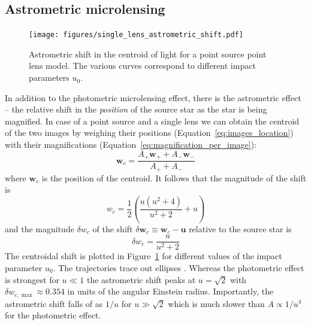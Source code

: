 \documentclass[12pt,dvipsnames]{report}
\renewcommand{\vec}[1]{\boldsymbol{\mathbf{#1}}}
\begin{document}
\subsection{Astrometric microlensing}
\label{ssec:astrometric_microlensing}
\begin{figure}[t]
    \begin{centering}
        \texttt{[image: figures/single\_lens\_astrometric\_shift.pdf]}
        \caption{
            Astrometric shift in the centroid of light for a point source point lens
            model.
            The various curves correspond to different impact parameters $u_0$.}
        \label{fig:single_lens_astrometric_shift}
    \end{centering}
\end{figure}

In addition to the photometric microlensing effect, there is the astrometric
effect -- the relative shift in the \emph{position} of the source star as the
star is being magnified. In case of a point source and a single lens we can
obtain the centroid of the two images by weighing their positions
(Equation~\ref{eq:images_location}) with their magnifications
(Equation~\ref{eq:magnification_per_image}):
\begin{equation}
    \vec w_c=\frac{A_+\vec w_+ + A_-\vec w_-}{A_+ + A_-}
\end{equation}
where $\vec w_c$ is the position of the centroid. It follows that the magnitude of the
shift is
\begin{equation}
    w_c=\frac{1}{2}\left(\frac{u(u^2 + 4)}{u^2+2}+u\right)
\end{equation}
and the magnitude $\delta w_c$ of the shift
$\delta \vec w_c\equiv\vec w_c - \vec u$ relative to the source star is
\begin{equation}
    \delta w_c = \frac{u}{u^2 + 2}
\end{equation}
The centroidal shift is plotted in Figure~\ref{fig:single_lens_astrometric_shift} for
different values of the impact parameter $u_0$. The trajectories trace out ellipses
\citep{1995ApJ...453...37W}.
Whereas the photometric effect is
strongest for
$u\ll 1$  the astrometric shift peaks at $u=\sqrt{2}$ with
$\delta w_{c,\max}\approx 0.354$ in units of the angular Einstein radius.
Importantly, the astrometric shift falls of as $1/u$ for $u\gg \sqrt{2}$  which is
much slower than $A\propto 1/u^4$ for the photometric effect.
\end{document}
